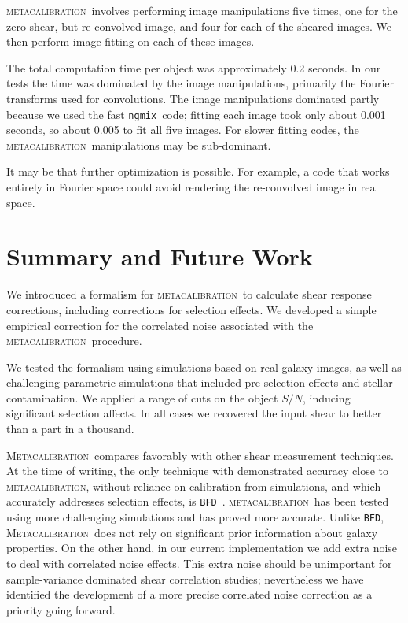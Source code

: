 \documentclass[iop]{emulateapj}
\newcommand{\snr}{$S/N$}
\newcommand{\mcal}{\textsc{metacalibration}}
\newcommand{\Mcal}{\textsc{Metacalibration}}
\newcommand{\ngmix}{\texttt{ngmix}}
\newcommand{\bfd}{\texttt{BFD}}
\begin{document}
\mcal\ involves performing image manipulations five times, one for the zero
shear, but re-convolved image, and four for each of the sheared images.
We then perform image fitting on each of these images.

The total computation time per object was approximately 0.2 seconds.  In our
tests the time was dominated by the image manipulations, primarily the Fourier
transforms used for convolutions.  The image manipulations dominated partly
because we used the fast \ngmix\ code; fitting each image took only about 0.001
seconds, so about 0.005 to fit all five images.  For slower fitting codes, the
\mcal\ manipulations may be sub-dominant.

It may be that further optimization is possible.  For example, a code that
works entirely in Fourier space could avoid rendering the re-convolved image in
real space.

\section{Summary and Future Work} \label{sec:summary}

We introduced a formalism for \mcal\ to calculate shear response corrections,
including corrections for selection effects. We developed a simple empirical
correction for the correlated noise associated with the \mcal\ procedure.

We tested the formalism using simulations based on real galaxy images, as well
as challenging parametric simulations that included pre-selection effects and
stellar contamination.  We applied a range of cuts on the object \snr, inducing
significant selection affects.  In all cases we recovered the input shear to
better than a part in a thousand.

\Mcal\ compares favorably with other shear measurement techniques.  At the time
of writing, the only technique with demonstrated accuracy close to \mcal,
without reliance on calibration from simulations, and which accurately
addresses selection effects, is \bfd\ \citep{bfd2016}.  \mcal\
has been tested using more challenging simulations and has proved more
accurate.  Unlike \bfd, \Mcal\ does not rely on significant
prior information about galaxy properties.  On the other hand, in our current
implementation we add extra noise to deal with correlated noise effects.  This
extra noise should be unimportant for sample-variance dominated shear
correlation studies; nevertheless we have identified the development of a more
precise correlated noise correction as a priority going forward.
\end{document}
